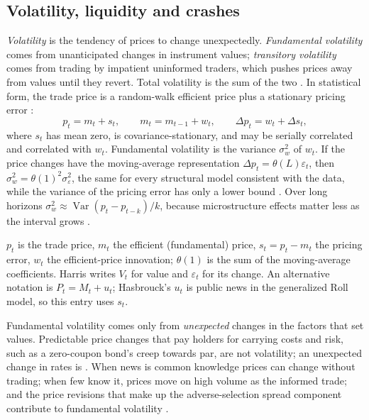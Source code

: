 \subsection{Volatility, liquidity and crashes}

\begin{qfdefinition}\label{def:volatility-components}
 \emph{Volatility} is the tendency of prices to change unexpectedly. \emph{Fundamental volatility} comes from unanticipated changes in instrument values; \emph{transitory volatility} comes from trading by impatient uninformed traders, which pushes prices away from values until they revert. Total volatility is the sum of the two \citep[chap.~``Volatility'', pp.~410, 413--414]{alpha-harris}. In statistical form, the trade price is a random-walk efficient price plus a stationary pricing error \citep[sec.~8.6, p.~72]{s6-hasbrouck}:
\[ p_t=m_t+s_t, \qquad m_t=m_{t-1}+w_t, \qquad \Delta p_t=w_t+\Delta s_t, \]
where $s_t$ has mean zero, is covariance-stationary, and may be serially correlated and correlated with $w_t$. Fundamental volatility is the variance $\sigma_w^2$ of $w_t$. If the price changes have the moving-average representation $\Delta p_t=\theta(L)\varepsilon_t$, then $\sigma_w^2=\theta(1)^2\sigma_\varepsilon^2$, the same for every structural model consistent with the data, while the variance of the pricing error has only a lower bound \citep[same sec., eqs.~(8.10)--(8.13), pp.~73--74]{s6-hasbrouck}. Over long horizons $\sigma_w^2\approx\operatorname{Var}(p_t-p_{t-k})/k$, because microstructure effects matter less as the interval grows \citep[sec.~8.3, p.~69]{s6-hasbrouck}.

 $p_t$ is the trade price, $m_t$ the efficient (fundamental) price, $s_t=p_t-m_t$ the pricing error, $w_t$ the efficient-price innovation; $\theta(1)$ is the sum of the moving-average coefficients. Harris writes $V_t$ for value and $\varepsilon_t$ for its change. An alternative notation is $P_t=M_t+u_t$; Hasbrouck's $u_t$ is public news in the generalized Roll model, so this entry uses $s_t$.

 Fundamental volatility comes only from \emph{unexpected} changes in the factors that set values. Predictable price changes that pay holders for carrying costs and risk, such as a zero-coupon bond's creep towards par, are not volatility; an unexpected change in rates is \citep[chap.~``Volatility'', pp.~411--412]{alpha-harris}. When news is common knowledge prices can change without trading; when few know it, prices move on high volume as the informed trade; and the price revisions that make up the adverse-selection spread component contribute to fundamental volatility \citep[same chap., p.~411]{alpha-harris}.


\end{qfdefinition}
